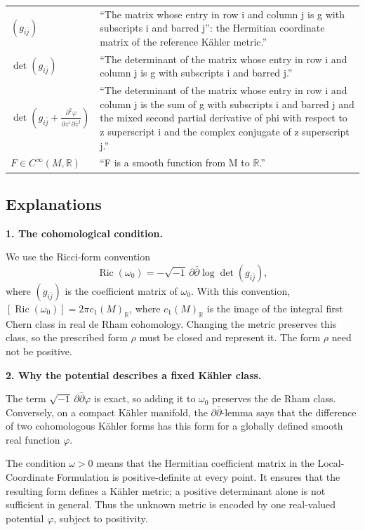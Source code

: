 \documentclass[11pt]{article}
\begin{document}
\begin{tabularx}{\textwidth}{@{}>{\raggedright\arraybackslash}p{}>{\raggedright\arraybackslash}X@{}}
$(g_{i\bar j})$
& ``The matrix whose entry in row i and column j is g with
subscripts i and barred j'': the Hermitian coordinate matrix
of the reference K\"ahler metric.'' \\

$\det(g_{i\bar j})$
& ``The determinant of the matrix whose entry in row i and column j
is g with subscripts i and barred j.'' \\

$\displaystyle
\det\!\left(
g_{i\bar j}
+\frac{\partial^2\varphi}{\partial z^i\,\partial\bar z^j}
\right)$
& ``The determinant of the matrix whose entry in row i and column j
is the sum of g with subscripts i and barred j and the mixed second
partial derivative of phi with respect to z superscript i and the
complex conjugate of z superscript j.'' \\

$F\in C^\infty(M,\mathbb R)$
& ``F is a smooth function from M to $\mathbb R$.'' \\
\end{tabularx}
\endgroup

\newpage

\subsection*{Explanations}

\textbf{1. The cohomological condition.}

We use the Ricci-form convention
\[
\operatorname{Ric}(\omega_0)
=-\sqrt{-1}\,\partial\bar\partial
\log\det(g_{i\bar j}),
\]
where $(g_{i\bar j})$ is the coefficient matrix of $\omega_0$.
With this convention,
$[\operatorname{Ric}(\omega_0)]=2\pi c_1(M)_{\mathbb R}$,
where $c_1(M)_{\mathbb R}$ is the image of the integral first Chern class
in real de Rham cohomology. Changing the metric preserves this class,
so the prescribed form $\rho$ must be closed and represent it.
The form $\rho$ need not be positive.

\textbf{2. Why the potential describes a fixed K\"ahler class.}

The term $\sqrt{-1}\,\partial\bar\partial\varphi$ is exact, so adding
it to $\omega_0$ preserves the de Rham class. Conversely, on a compact
K\"ahler manifold, the $\partial\bar\partial$-lemma says that the
difference of two cohomologous K\"ahler forms has this form for a
globally defined smooth real function $\varphi$.

The condition $\omega>0$ means that the Hermitian coefficient matrix
in the Local-Coordinate Formulation is positive-definite at every point.
It ensures that the resulting form defines a K\"ahler metric;
a positive determinant alone is not sufficient in general.
Thus the unknown metric is encoded by one real-valued potential
$\varphi$, subject to positivity.
\end{document}
